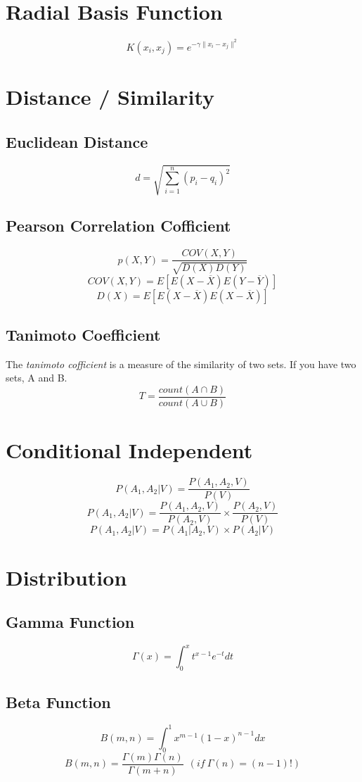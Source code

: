 \documentclass[twocolumn]{article}
\begin{document}
\section{Radial Basis Function}
\[
	K(x_i, x_j) = e^{-\gamma \|x_i - x_j \|^2}
\]

\section{Distance / Similarity}

\subsection{Euclidean Distance}
\[
	d = \sqrt{\sum_{i=1}^n (p_i - q_i)^2}
\]

\subsection{Pearson Correlation Cofficient}
\[
	p(X, Y) = \frac{COV(X, Y)}{\sqrt{D(X) D(Y)}}
\]
\[
	COV(X, Y) = E[E(X-\overline{X})E(Y-\overline{Y})]
\]
\[
	D(X) = E[E(X-\overline{X})E(X-\overline{X})]
\]

\subsection{Tanimoto Coefficient}
The \emph{tanimoto cofficient} is a measure of the similarity of two sets. If you have two sets, A and B. 
\[
	T = \frac{count(A \cap B)}{count(A \cup B)}
\]

\section{Conditional Independent}
\[P(A_1, A_2 | V) = \frac{P(A_1, A_2, V)}{P(V)} \]
\[P(A_1, A_2 | V) = \frac{P(A_1, A_2, V)}{P(A_2, V)} \times \frac{P(A_2, V)}{P(V)} \]
\[P(A_1, A_2 | V) = P(A_1 | A_2, V) \times P(A_2 | V) \]

\section{Distribution}
\subsection{Gamma Function}
\[\Gamma (x) = \int_0^xt^{x-1}e^{-t}dt \]

\subsection{Beta Function}
\[B(m,n) = \int_0^1 x^{m-1}(1-x)^{n-1}dx  \]
\[B(m,n) = \frac{\Gamma(m)\Gamma(n)}{\Gamma(m+n)} ~~(if ~ \Gamma(n) = (n-1)!) \]
\end{document}
